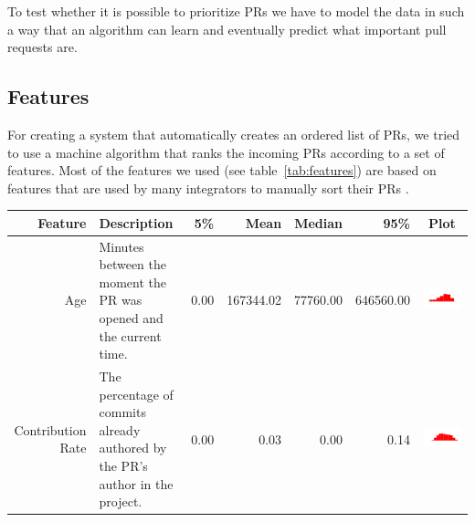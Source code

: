 \documentclass[conference]{IEEEtran}
\begin{document}
To test whether it is possible to prioritize PRs we have to model the data in such a way that an algorithm can learn and eventually predict what important pull requests are.

\subsection{Features}
\label{sec:features}

For creating a system that automatically creates an ordered list of PRs, we tried to use a machine algorithm that ranks the incoming PRs according to a set of features.
Most of the features we used (see table~\ref{tab:features}) are based on features that are used by many integrators to manually sort their PRs \cite{GZSD15}.

\begin{table}[ht]
  \centering
  \begin{tabular}{rp{26em}rrrrc}
    \hline
    \textbf{Feature} & \textbf{Description} & \textbf{5\%} & \textbf{Mean} & \textbf{Median} & \textbf{95\%} & \textbf{Plot} \\
    \hline
    Age & Minutes between the moment the PR was opened and the current time. & 0.00 & 167344.02 & 77760.00 & 646560.00 & \includegraphics[scale = 0.1, clip = true, trim= 50px 60px 50px 60px]{../figs/hist-features/hist-age.pdf} \\
    Contribution Rate & The percentage of commits already authored by the PR's author in the project. & 0.00 & 0.03 & 0.00 & 0.14 & \includegraphics[scale = 0.1, clip = true, trim= 50px 60px 50px 60px]{../figs/hist-features/hist-commitRatio.pdf} \\

\end{tabular}
\end{table}
\end{document}
